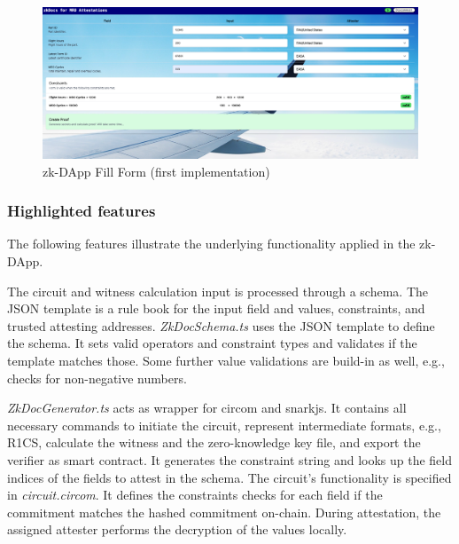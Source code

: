 \begin{figure}[hbt]
	\centering
		\includegraphics[width=1.0\textwidth]{Pictures/form.png}
	\caption{zk-DApp Fill Form (first implementation)}
	\label{fig:form}
\end{figure}

\subsubsection{Highlighted features}
The following features illustrate the underlying functionality applied in the zk-DApp.


The circuit and witness calculation input is processed through a schema. The JSON template is a rule book for the input field and values, constraints, and trusted attesting addresses. \textit{ZkDocSchema.ts} uses the JSON template to define the schema. It sets valid operators and constraint types and validates if the template matches those. Some further value validations are build-in as well, e.g., checks for non-negative numbers. 

\textit{ZkDocGenerator.ts} acts as wrapper for circom and snarkjs. It contains all necessary commands to initiate the circuit, represent intermediate formats, e.g., R1CS, calculate the witness and the zero-knowledge key file, and export the verifier as smart contract. It generates the constraint string and looks up the field indices of the fields to attest in the schema. The circuit's functionality is specified in \textit{circuit.circom}. It defines the constraints checks for each field if the commitment matches the hashed commitment on-chain. During attestation, the assigned attester performs the decryption of the values locally.

